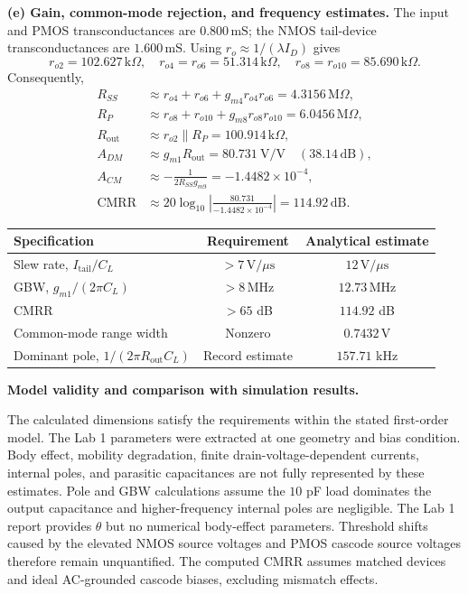 \documentclass[12pt,letterpaper]{article}
\newcommand{\mS}{\,\mathrm{mS}}
\newcommand{\kohm}{\,\mathrm{k}\Omega}
\newcommand{\Mohm}{\,\mathrm{M}\Omega}
\newcommand{\V}{\,\mathrm{V}}
\newcommand{\MHz}{\,\mathrm{MHz}}
\newcommand{\Vus}{\,\mathrm{V}/\mu\mathrm{s}}
\begin{document}
\begin{enumerate}
\textbf{(e) Gain, common-mode rejection, and frequency estimates.}
The input and PMOS transconductances are $0.800\mS$;
the NMOS tail-device transconductances are $1.600\mS$.
Using $r_o\approx1/(\lambda I_D)$ gives
\[
r_{o2}=102.627\kohm,\quad
r_{o4}=r_{o6}=51.314\kohm,\quad
r_{o8}=r_{o10}=85.690\kohm.
\]
Consequently,
\begin{align*}
R_{SS}&\approx r_{o4}+r_{o6}+g_{m4}r_{o4}r_{o6}=4.3156\Mohm,\\
R_P&\approx r_{o8}+r_{o10}+g_{m8}r_{o8}r_{o10}=6.0456\Mohm,\\
R_{\mathrm{out}}&\approx r_{o2}\parallel R_P=100.914\kohm,\\
A_{DM}&\approx g_{m1}R_{\mathrm{out}}=80.731\ \mathrm{V/V}
\quad(38.14\,\mathrm{dB}),\\
A_{CM}&\approx-\frac{1}{2R_{SS}g_{m9}}=-1.4482\times10^{-4},\\
\mathrm{CMRR}&\approx20\log_{10}\left|\frac{80.731}{-1.4482\times10^{-4}}\right|
=114.92\,\mathrm{dB}.
\end{align*}
\begin{center}
\small
\begin{tabular}{@{}lcc@{}}
\toprule
Specification & Requirement & Analytical estimate\\
\midrule
Slew rate, $I_{\mathrm{tail}}/C_L$ & $>7\Vus$ & $12\Vus$\\
GBW, $g_{m1}/(2\pi C_L)$ & $>8\MHz$ & $12.73\MHz$\\
CMRR & $>65$ dB & $114.92$ dB\\
Common-mode range width & Nonzero & $0.7432\V$\\
Dominant pole, $1/(2\pi R_{\mathrm{out}}C_L)$ & Record estimate & $157.71$ kHz\\
\bottomrule
\end{tabular}
\end{center}

\end{enumerate}

\newpage
\textbf{Model validity and comparison with simulation results.}

The calculated dimensions satisfy the requirements within the stated
first-order model. The Lab 1 parameters were extracted at one geometry
and bias condition. Body effect, mobility degradation, finite
drain-voltage-dependent currents, internal poles, and parasitic
capacitances are not fully represented by these estimates. Pole and
GBW calculations assume the $10$ pF load dominates the output
capacitance and higher-frequency internal poles are negligible.
The Lab 1 report provides $\theta$ but no numerical body-effect
parameters. Threshold shifts caused by the elevated NMOS source
voltages and PMOS cascode source voltages therefore remain
unquantified. The computed CMRR assumes matched devices and ideal
AC-grounded cascode biases, excluding mismatch effects.
\end{document}
